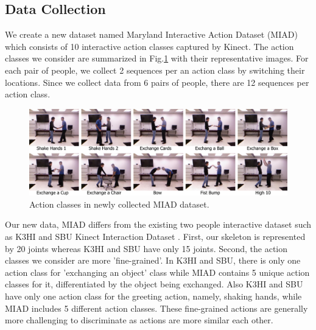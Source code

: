 \documentclass[10pt,twocolumn,letterpaper]{article}
\begin{document}
\subsection{Data Collection}

We create a new dataset named Maryland Interactive Action Dataset (MIAD) which consists of 10 interactive action classes captured by Kinect. The action classes we consider are summarized in Fig.\ref{fig:newactions} with their representative images. For each pair of people, we collect 2 sequences per an action class by switching their locations. Since we collect data from 6 pairs of people, there are 12 sequences per action class. 

\begin{figure}[htb]
\begin{center}
\includegraphics[width=6.8in]{newactions.pdf}
\caption{Action classes in newly collected MIAD dataset.  \label{fig:newactions}}
\end{center}
\end{figure}

Our new data, MIAD differs from the existing two people interactive dataset such as K3HI \cite{K3HI} and SBU Kinect Interaction Dataset \cite{Yun2012}. First, our skeleton is represented by 20 joints whereas K3HI and SBU have only 15 joints. Second, the action classes we consider are more 'fine-grained'. In K3HI and SBU, there is only one action class for 'exchanging an object' class while MIAD contains 5 unique action classes for it, differentiated by the object being exchanged. Also K3HI and SBU have only one action class for the greeting action, namely, shaking hands, while MIAD includes 5 different action classes. These fine-grained actions are generally more challenging to discriminate as actions are more similar each other.


\end{document}
